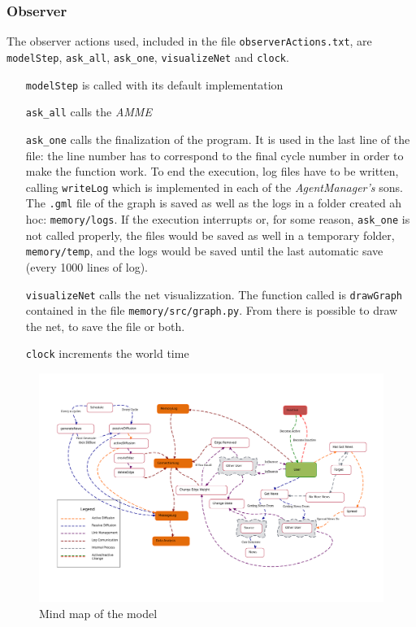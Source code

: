 \subsubsection{Observer}
The observer actions used, included in the file \texttt{observerActions.txt},
are \texttt{modelStep}, \texttt{ask\_all}, \texttt{ask\_one},
\texttt{visualizeNet} and \texttt{clock}.
\begin{itemize}
\item[\texttt{modelStep}] is called with its default implementation
\item[\texttt{ask\_all}] calls the \textit{AMME}
\item[\texttt{ask\_one}] calls the finalization of the program. It
  is used in the last line of the file: the line number has to correspond
  to the final cycle number in order to make the function work.
  To end the execution, log files have to be written, calling
  \texttt{writeLog} which is implemented in each of the \textit{AgentManager's}
  sons. The \texttt{.gml} file of the graph is saved as well as the logs
  in a folder created ah hoc: \texttt{memory/logs}.
  If the execution interrupts or, for some reason, \texttt{ask\_one} is not
  called properly, the files would be saved as well in a temporary folder,
  \texttt{memory/temp}, and the logs would be saved until the last
  automatic save (every 1000 lines of log).
\item[\texttt{visualizeNet}] calls the net visualizzation. The function called
  is \texttt{drawGraph} contained in the file \texttt{memory/src/graph.py}.
  From there is possible to draw the net, to save the file or both.
\item[\texttt{clock}] increments the world time 
\end{itemize}

\begin{figure}[htpb]
  \centering
  \includegraphics[trim={2cm 3cm 1.5cm 2cm}, clip,width=\columnwidth]{img/pdf/mindMap.pdf}
  \caption{Mind map of the model}
  \label{fig:mindmap}
\end{figure}

